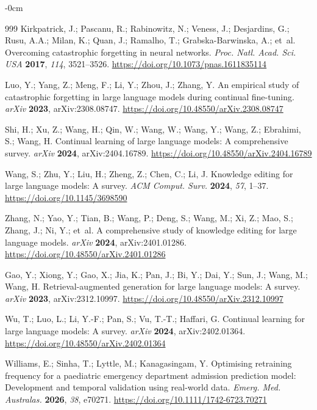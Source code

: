 \documentclass[electronics,article,submit,pdftex,moreauthors]{Definitions/mdpi}
\begin{document}
\begin{adjustwidth}{-\extralength}{0cm}
\begin{thebibliography}{999}
Kirkpatrick, J.; Pascanu, R.; Rabinowitz, N.; Veness, J.; Desjardins, G.; Rusu, A.A.; Milan, K.; Quan, J.; Ramalho, T.; Grabska-Barwinska, A.; et~al. Overcoming catastrophic forgetting in neural networks. {\em Proc. Natl. Acad. Sci. USA} {\bf 2017}, {\em 114}, 3521--3526. \url{https://doi.org/10.1073/pnas.1611835114}

Luo, Y.; Yang, Z.; Meng, F.; Li, Y.; Zhou, J.; Zhang, Y. An empirical study of catastrophic forgetting in large language models during continual fine-tuning. {\em arXiv} {\bf 2023}, arXiv:2308.08747. \url{https://doi.org/10.48550/arXiv.2308.08747}

Shi, H.; Xu, Z.; Wang, H.; Qin, W.; Wang, W.; Wang, Y.; Wang, Z.; Ebrahimi, S.; Wang, H. Continual learning of large language models: A comprehensive survey. {\em arXiv} {\bf 2024}, arXiv:2404.16789. \url{https://doi.org/10.48550/arXiv.2404.16789}

Wang, S.; Zhu, Y.; Liu, H.; Zheng, Z.; Chen, C.; Li, J. Knowledge editing for large language models: A survey. {\em ACM Comput. Surv.} {\bf 2024}, {\em 57}, 1--37. \url{https://doi.org/10.1145/3698590}

Zhang, N.; Yao, Y.; Tian, B.; Wang, P.; Deng, S.; Wang, M.; Xi, Z.; Mao, S.; Zhang, J.; Ni, Y.; et~al. A comprehensive study of knowledge editing for large language models. {\em arXiv} {\bf 2024}, arXiv:2401.01286. \url{https://doi.org/10.48550/arXiv.2401.01286}

Gao, Y.; Xiong, Y.; Gao, X.; Jia, K.; Pan, J.; Bi, Y.; Dai, Y.; Sun, J.; Wang, M.; Wang, H. Retrieval-augmented generation for large language models: A survey. {\em arXiv} {\bf 2023}, arXiv:2312.10997. \url{https://doi.org/10.48550/arXiv.2312.10997}

Wu, T.; Luo, L.; Li, Y.-F.; Pan, S.; Vu, T.-T.; Haffari, G. Continual learning for large language models: A survey. {\em arXiv} {\bf 2024}, arXiv:2402.01364. \url{https://doi.org/10.48550/arXiv.2402.01364}

Williams, E.; Sinha, T.; Lyttle, M.; Kanagasingam, Y. Optimising retraining frequency for a paediatric emergency department admission prediction model: Development and temporal validation using real-world data. {\em Emerg. Med. Australas.} {\bf 2026}, {\em 38}, e70271. \url{https://doi.org/10.1111/1742-6723.70271}


\end{thebibliography}
\end{adjustwidth}
\end{document}
